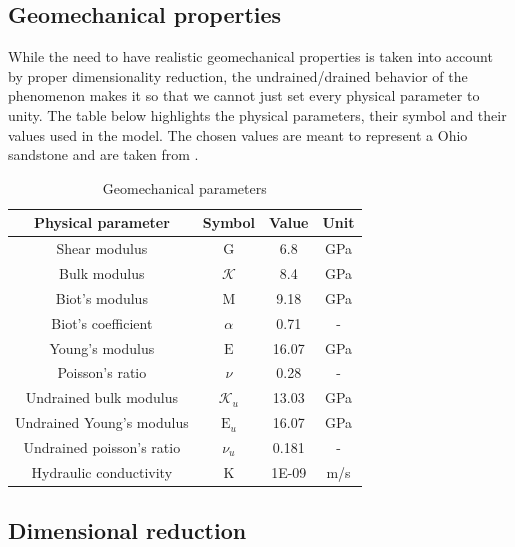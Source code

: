\documentclass{article}
\begin{document}
\subsection{Geomechanical properties}

While the need to have realistic geomechanical properties is taken into account by proper dimensionality reduction, the undrained/drained behavior of the phenomenon makes it so that we cannot just set every physical parameter to unity. The table below highlights the physical parameters, their symbol and their values used in the model. The chosen values are meant to represent a Ohio sandstone and are taken from .

\begin{table}[h]
\center
\begin{tabular}{|cccc|}
\hline 
Physical parameter & Symbol & Value & Unit \\ 
\hline \hline
Shear modulus & $\mathrm{G}$ & 6.8 & GPa \\ 
\hline 
Bulk modulus & $\mathcal{K}$ & 8.4 & GPa \\ 
\hline 
Biot's modulus & $\mathrm{M}$ & 9.18 & GPa \\ 
\hline 
Biot's coefficient & $\alpha$ & 0.71 & - \\ 
\hline 
Young's modulus & $\mathrm{E}$ & 16.07 & GPa \\ 
\hline 
Poisson's ratio & $\nu$ & 0.28 & - \\ 
\hline 
Undrained bulk modulus & $\mathcal{K}_u$ & 13.03 & GPa \\ 
\hline 
Undrained Young's modulus & $\mathrm{E}_u$ & 16.07 & GPa \\ 
\hline 
Undrained poisson's ratio & $\nu_u$ & 0.181 & - \\ 
\hline
Hydraulic conductivity & $\mathrm{K}$ & 1E-09 & m/s \\ 
\hline

\end{tabular} 
\caption{Geomechanical parameters}
\label{tab:params}
\end{table}
\FloatBarrier

\subsection{Dimensional reduction}
\end{document}
